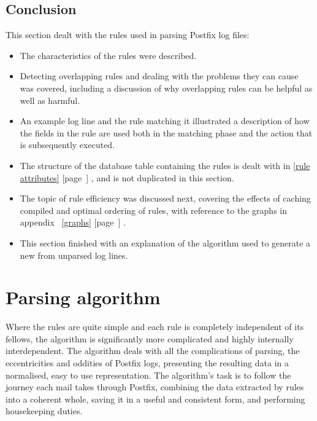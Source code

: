 \documentclass[a4paper,12pt,draft]{article}
\newcommand{\refwithpage}[1]{%
    \empty{}\ref{#1} [page~\pageref{#1}]%
}
\newcommand{\sectionref}[1]{%
    \textsection{}\refwithpage{#1}%
}
\begin{document}
\subsection{Conclusion}

This section dealt with the rules used in parsing Postfix log files:

\begin{itemize}

    \item The characteristics of the rules were described.

    \item Detecting overlapping rules and dealing with the problems they
        can cause was covered, including a discussion of why overlapping
        rules can be helpful as well as harmful.

    \item An example log line and the rule matching it illustrated a
        description of how the fields in the rule are used both in the
        matching phase and the action that is subsequently executed.

    \item The structure of the database table containing the rules is dealt
        with in \sectionref{rule attributes}, and is not duplicated in this
        section.

    \item The topic of rule efficiency was discussed next, covering the
        effects of caching compiled \regexes{} and optimal ordering of
        rules, with reference to the graphs in
        appendix~\refwithpage{graphs}.

    \item This section finished with an explanation of the algorithm used
        to generate a new \regex{} from unparsed log lines.

\end{itemize}

\section{Parsing algorithm}

\label{parsing-algorithm}

Where the rules are quite simple and each rule is completely independent of
its fellows, the algorithm is significantly more complicated and highly
internally interdependent.  The algorithm deals with all the complications
of parsing, the eccentricities and oddities of Postfix logs, presenting the
resulting data in a normalised, easy to use representation.  The
algorithm's task is to follow the journey each mail takes through Postfix,
combining the data extracted by rules into a coherent whole, saving it in a
useful and consistent form, and performing housekeeping duties.
\end{document}
